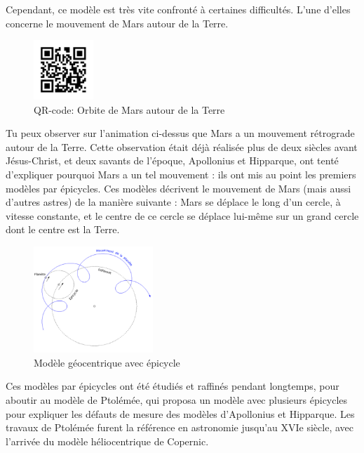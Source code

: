\documentclass[
  letterpaper,
  DIV=11,
  numbers=noendperiod]{scrartcl}
\theoremstyle{definition}
\theoremstyle{definition}
\theoremstyle{definition}
\theoremstyle{remark}
\begin{document}
Cependant, ce modèle est très vite confronté à certaines difficultés.
L'une d'elles concerne le mouvement de Mars autour de la Terre.

\begin{figure}[H]

{\centering \includegraphics[width=0.2\textwidth,height=\textheight]{figures/grav/mars.pdf}

}

\caption{QR-code: Orbite de Mars autour de la Terre}

\end{figure}%

Tu peux observer sur l'animation ci-dessus que Mars a un mouvement
rétrograde autour de la Terre. Cette observation était déjà réalisée
plus de deux siècles avant Jésus-Christ, et deux savants de l'époque,
Apollonius et Hipparque, ont tenté d'expliquer pourquoi Mars a un tel
mouvement : ils ont mis au point les premiers modèles par épicycles. Ces
modèles décrivent le mouvement de Mars (mais aussi d'autres astres) de
la manière suivante : Mars se déplace le long d'un cercle, à vitesse
constante, et le centre de ce cercle se déplace lui-même sur un grand
cercle dont le centre est la Terre.

\begin{figure}[H]

{\centering \includegraphics[width=0.4\textwidth,height=\textheight]{figures/grav/epicycle.pdf}

}

\caption{Modèle géocentrique avec épicycle}

\end{figure}%

Ces modèles par épicycles ont été étudiés et raffinés pendant longtemps,
pour aboutir au modèle de Ptolémée, qui proposa un modèle avec plusieurs
épicycles pour expliquer les défauts de mesure des modèles d'Apollonius
et Hipparque. Les travaux de Ptolémée furent la référence en astronomie
jusqu'au XVIe siècle, avec l'arrivée du modèle héliocentrique de
Copernic.
\end{document}
